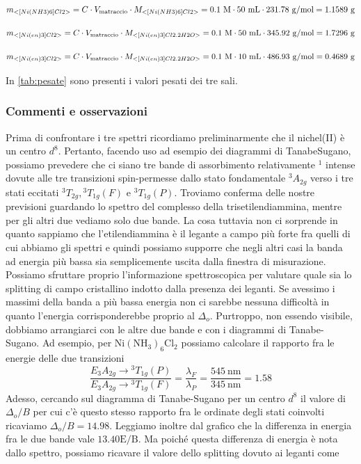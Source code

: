 \[ m_{<[Ni(NH3)6]Cl2>} = C \cdot V_{\text{matraccio}} \cdot M_{<[Ni(NH3)6]Cl2>}  = 0.1 \mathrm{\ M} \cdot 50 \mathrm{\ mL} \cdot 231.78 \mathrm{\ g/mol} = 1.1589 \mathrm{\ g} \]

\[ m_{<[Ni(en)3]Cl2>} = C \cdot V_{\text{matraccio}} \cdot M_{<[Ni(en)3]Cl2.2H2O>}  = 0.1 \mathrm{\ M} \cdot 50 \mathrm{\ mL} \cdot 345.92 \mathrm{\ g/mol} = 1.7296 \mathrm{\ g} \]

\[ m_{<[Ni(en)3]Cl2>} = C \cdot V_{\text{matraccio}} \cdot M_{<[Ni(en)3]Cl2.2H2O>}  = 0.1 \mathrm{\ M} \cdot 10 \mathrm{\ mL} \cdot 486.93 \mathrm{\ g/mol} = 0.4689\mathrm{\ g} \]

In  \autoref{tab:pesate} sono presenti i valori pesati dei tre sali.
\subsubsection{Commenti e osservazioni}
Prima di confrontare i tre spettri ricordiamo preliminarmente che il nichel(II) è un centro $d^8$. Pertanto, facendo uso ad esempio dei diagrammi di TanabeSugano, possiamo prevedere che ci siano tre bande di assorbimento relativamente $^1$ intense dovute alle tre transizioni spin-permesse dallo stato fondamentale ${ }^3 A_{2 g}$ verso i tre stati eccitati ${ }^3 T_{2 g},{ }^3 T_{1 g}(F)$ e ${ }^3 T_{1 g}(P)$. Troviamo conferma delle nostre previsioni guardando lo spettro del complesso della trisetilendiammina, mentre per gli altri due vediamo solo due bande. La cosa tuttavia non ci sorprende in quanto sappiamo che l'etilendiammina è il legante a campo più forte fra quelli di cui abbiamo gli spettri e quindi possiamo supporre che negli altri casi la banda ad energia più bassa sia semplicemente uscita dalla finestra di misurazione. Possiamo sfruttare proprio l'informazione spettroscopica per valutare quale sia lo splitting di campo cristallino indotto dalla presenza dei leganti. Se avessimo i massimi della banda a più bassa energia non ci sarebbe nessuna difficoltà in quanto l'energia corrisponderebbe proprio al $\Delta_o$. Purtroppo, non essendo visibile, dobbiamo arrangiarci con le altre due bande e con i diagrammi di Tanabe-Sugano. Ad esempio, per $\mathrm{Ni}\left(\mathrm{NH}_3\right)_6 \mathrm{Cl}_2$ possiamo calcolare il rapporto fra le energie delle due transizioni
$$
\frac{E_3 A_{2 g} \rightarrow{ }^3 T_{1 g}(P)}{E_3 A_{2 g} \rightarrow{ }^3 T_{1 g}(F)}=\frac{\lambda_F}{\lambda_P}=\frac{545 \mathrm{~nm}}{345 \mathrm{~nm}}=1.58
$$
Adesso, cercando sul diagramma di Tanabe-Sugano per un centro $d^8$ il valore di $\Delta_o / B$ per cui c'è questo stesso rapporto fra le ordinate degli stati coinvolti ricaviamo $\Delta_o / B=14.98$. Leggiamo inoltre dal grafico che la differenza in energia fra le due bande vale $13.40 \mathrm{E} / \mathrm{B}$. Ma poiché questa differenza di energia è nota dallo spettro, possiamo ricavare il valore dello splitting dovuto ai leganti come

